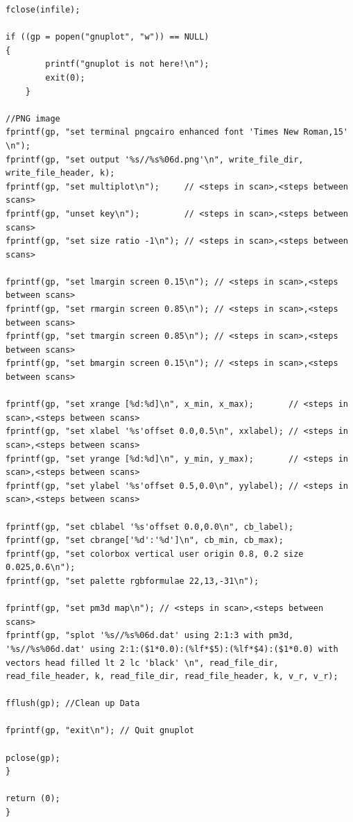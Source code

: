 \documentclass[12pt,a4paper]{jsarticle}
\begin{document}
\begin{lstlisting}
fclose(infile);

if ((gp = popen("gnuplot", "w")) == NULL)
{
        printf("gnuplot is not here!\n");
        exit(0);
    }

//PNG image
fprintf(gp, "set terminal pngcairo enhanced font 'Times New Roman,15' \n");
fprintf(gp, "set output '%s//%s%06d.png'\n", write_file_dir, write_file_header, k);
fprintf(gp, "set multiplot\n");     // <steps in scan>,<steps between scans>
fprintf(gp, "unset key\n");         // <steps in scan>,<steps between scans>
fprintf(gp, "set size ratio -1\n"); // <steps in scan>,<steps between scans>

fprintf(gp, "set lmargin screen 0.15\n"); // <steps in scan>,<steps between scans>
fprintf(gp, "set rmargin screen 0.85\n"); // <steps in scan>,<steps between scans>
fprintf(gp, "set tmargin screen 0.85\n"); // <steps in scan>,<steps between scans>
fprintf(gp, "set bmargin screen 0.15\n"); // <steps in scan>,<steps between scans>

fprintf(gp, "set xrange [%d:%d]\n", x_min, x_max);       // <steps in scan>,<steps between scans>
fprintf(gp, "set xlabel '%s'offset 0.0,0.5\n", xxlabel); // <steps in scan>,<steps between scans>
fprintf(gp, "set yrange [%d:%d]\n", y_min, y_max);       // <steps in scan>,<steps between scans>
fprintf(gp, "set ylabel '%s'offset 0.5,0.0\n", yylabel); // <steps in scan>,<steps between scans>

fprintf(gp, "set cblabel '%s'offset 0.0,0.0\n", cb_label);
fprintf(gp, "set cbrange['%d':'%d']\n", cb_min, cb_max);
fprintf(gp, "set colorbox vertical user origin 0.8, 0.2 size 0.025,0.6\n");
fprintf(gp, "set palette rgbformulae 22,13,-31\n");

fprintf(gp, "set pm3d map\n"); // <steps in scan>,<steps between scans>
fprintf(gp, "splot '%s//%s%06d.dat' using 2:1:3 with pm3d, '%s//%s%06d.dat' using 2:1:($1*0.0):(%lf*$5):(%lf*$4):($1*0.0) with vectors head filled lt 2 lc 'black' \n", read_file_dir, read_file_header, k, read_file_dir, read_file_header, k, v_r, v_r);

fflush(gp); //Clean up Data

fprintf(gp, "exit\n"); // Quit gnuplot

pclose(gp);
}

return (0);
}
\end{lstlisting}

\newpage
\end{document}
